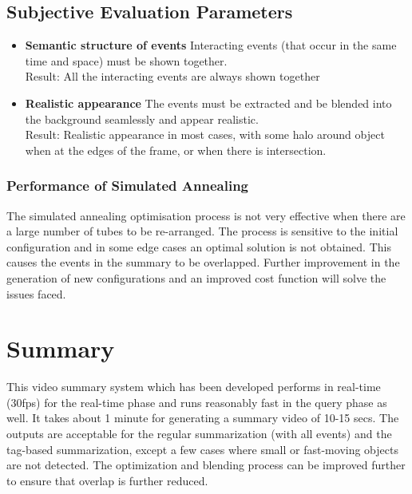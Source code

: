     \subsection{Subjective Evaluation Parameters}

    \begin{itemize}
        \item \textbf{Semantic structure of events}
        Interacting events (that occur in the same time and space) must be
        shown together. \\
        Result: All the interacting events are always shown together
        \item \textbf{Realistic appearance}
        The events must be extracted and be blended into the background
        seamlessly and appear realistic. \\
        Result: Realistic appearance in most cases, with some halo around
        object when at the edges of the frame, or when there is intersection.
    \end{itemize}

    \subsubsection{Performance of Simulated Annealing}
    The simulated annealing optimisation process is not very effective when
    there are a large number of tubes to be re-arranged. The process is
    sensitive to the initial configuration and in some edge cases an optimal
    solution is not obtained. This causes the events in the summary to be
    overlapped. Further improvement in the generation of new configurations and
    an improved cost function will solve the issues faced.

\pagebreak

\section{Summary}

This video summary system which has been developed performs in real-time (30fps)
for the real-time phase and runs reasonably fast in the query phase as well. It
takes about 1 minute for generating a summary video of 10-15 secs.
The outputs are acceptable for the regular summarization (with all events) and
the tag-based summarization, except a few cases where small or fast-moving
objects are not detected. The optimization and blending process can be
improved further to ensure that overlap is further reduced.
